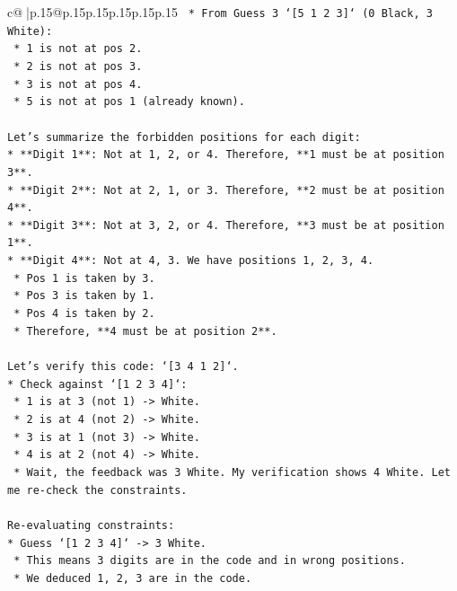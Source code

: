 \documentclass{article}
\begin{document}
{\begin{supertabular}{c@{$\;$}|p{.15\linewidth}@{}p{.15\linewidth}p{.15\linewidth}p{.15\linewidth}p{.15\linewidth}p{.15\linewidth}}
{{{\texttt{    *   From Guess 3 `{[}5 1 2 3{]}` (0 Black, 3 White):} \\
\texttt{        *   1 is not at pos 2.} \\
\texttt{        *   2 is not at pos 3.} \\
\texttt{        *   3 is not at pos 4.} \\
\texttt{        *   5 is not at pos 1 (already known).} \\
\\ 
\texttt{Let's summarize the forbidden positions for each digit:} \\
\texttt{*   **Digit 1**: Not at 1, 2, or 4. Therefore, **1 must be at position 3**.} \\
\texttt{*   **Digit 2**: Not at 2, 1, or 3. Therefore, **2 must be at position 4**.} \\
\texttt{*   **Digit 3**: Not at 3, 2, or 4. Therefore, **3 must be at position 1**.} \\
\texttt{*   **Digit 4**: Not at 4, 3. We have positions 1, 2, 3, 4.} \\
\texttt{    *   Pos 1 is taken by 3.} \\
\texttt{    *   Pos 3 is taken by 1.} \\
\texttt{    *   Pos 4 is taken by 2.} \\
\texttt{    *   Therefore, **4 must be at position 2**.} \\
\\ 
\texttt{Let's verify this code: `{[}3 4 1 2{]}`.} \\
\texttt{*   Check against `{[}1 2 3 4{]}`:} \\
\texttt{    *   1 is at 3 (not 1) {-}> White.} \\
\texttt{    *   2 is at 4 (not 2) {-}> White.} \\
\texttt{    *   3 is at 1 (not 3) {-}> White.} \\
\texttt{    *   4 is at 2 (not 4) {-}> White.} \\
\texttt{    *   Wait, the feedback was 3 White. My verification shows 4 White. Let me re{-}check the constraints.} \\
\\ 
\texttt{Re{-}evaluating constraints:} \\
\texttt{*   Guess `{[}1 2 3 4{]}` {-}> 3 White.} \\
\texttt{    *   This means 3 digits are in the code and in wrong positions.} \\
\texttt{    *   We deduced 1, 2, 3 are in the code.} \\
}}}
\end{supertabular}}
\end{document}
